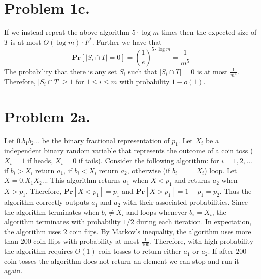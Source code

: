 \documentclass[12pt]{article}
\begin{document}
\section*{Problem 1c.}
If we instead repeat the above algorithm $5 \cdot \log m$ times then the
expected size of $T$ is at most $O(\log m)\cdot F^*$. Further we have that
$$\textbf{Pr}[|S_i\cap T| = 0]
= \left(\frac{1}{e}\right)^{5\cdot \log m} = \frac{1}{m^5}$$
The probability that there is any set $S_i$ such that $|S_i\cap T| = 0$ is at
most $\frac{1}{m^4}$. Therefore, $|S_i\cap T| \ge 1$ for $1 \le i \le m$ with
probability $1-o(1)$.

\newpage
\section*{Problem 2a.}
Let $0.b_1b_2...$ be the binary fractional representation of $p_1$. Let $X_i$
be a independent binary random variable that represents the outcome of a coin
toss ($X_i = 1$ if heads, $X_i = 0$ if tails). Consider the following algorithm:
for $i = 1,2,...$ if $b_i > X_i$ return $a_1$, if $b_i < X_i$ return $a_2$,
otherwise (if $b_i == X_i$) loop. Let $X = 0.X_1X_2...$ This algorithm returns
$a_1$ when $X < p_1$ and returns $a_2$ when $X > p_1$. Therefore,
$\textbf{Pr}[X < p_1] = p_1$ and $\textbf{Pr}[X > p_1] = 1 - p_1 = p_2$.
Thus the algorithm correctly outputs $a_1$ and $a_2$ with their associated
probabilities. Since the algorithm terminates when $b_i \neq X_i$ and loops
whenever $b_i = X_i$, the algorithm terminates with probability $1/2$ during
each iteration. In expectation, the algorithm uses $2$ coin flips. By Markov's
inequality, the algorithm uses more than $200$ coin flips with probability at
most  $\frac{1}{100}$. Therefore, with high probability the algorithm requires
$O(1)$ coin tosses to return either $a_1$ or $a_2$. If after $200$ coin tosses
the algorithm does not return an element we can stop and run it again.
\end{document}

